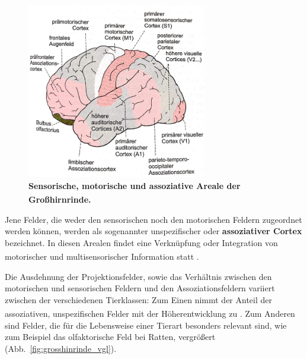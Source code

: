 \documentclass[12pt,a4paper,pdftex]{article}
\begin{document}
\begin{figure}[H]
    \centering
    \includegraphics[width=0.7\textwidth]{pictures/Bilder_Jule/Andere/Grosshirnrinde_sensorik_motorik.png}
    \caption[Sensorische, motorische und assoziative Areale der Großhirnrinde]{\textbf{Sensorische, motorische und assoziative Areale der Großhirnrinde.} \textsuperscript{\cite[14]{penzlin2005tierphys}}}
    \label{fig:grosshirnrinde_sensorik_motorik}
\end{figure}

\noindent Jene Felder, die weder den sensorischen noch den motorischen Feldern zugeordnet werden können, werden als sogenannter unspezifischer oder \textbf{assoziativer Cortex} bezeichnet. In diesen Arealen findet eine Verknüpfung oder Integration von motorischer und multisensorischer Information statt \textsuperscript{\cite[14]{penzlin2005tierphys}}. 

\noindent Die Ausdehnung der Projektionsfelder, sowie das Verhältnis zwischen den motorischen und sensorischen Feldern und den Assoziationsfeldern variiert zwischen der verschiedenen Tierklassen: Zum Einen nimmt der Anteil der assoziativen, unspezifischen Felder mit der Höherentwicklung zu \textsuperscript{\cite[14]{penzlin2005tierphys}}. Zum Anderen sind Felder, die für die Lebensweise einer Tierart besonders relevant sind, wie zum Beispiel das olfaktorische Feld bei Ratten, vergrößert (Abb.~\ref{fig:grosshinrinde_vgl}).
\end{document}
